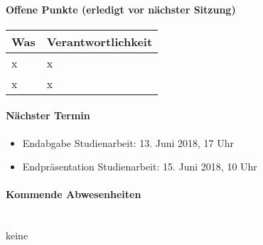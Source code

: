 \paragraph{Offene Punkte (erledigt vor nächster Sitzung)} \mbox{}

\begin{table}[H]
	\centering
	\begin{tabularx}{\textwidth}{X | p{4.5cm}}
		\rowcolor{gray!50}
		\textbf{Was} & \textbf{Verantwortlichkeit} \\
		\hline
		x & x \\
		x & x \\
	\end{tabularx}
	\label{tab:my-label}
\end{table}

\paragraph{Nächster Termin}
\begin{itemize}	
	\item Endabgabe Studienarbeit: 13. Juni 2018, 17 Uhr
	\item Endpräsentation Studienarbeit: 15. Juni 2018, 10 Uhr
\end{itemize}

\paragraph{Kommende Abwesenheiten} \mbox{}\\
keine